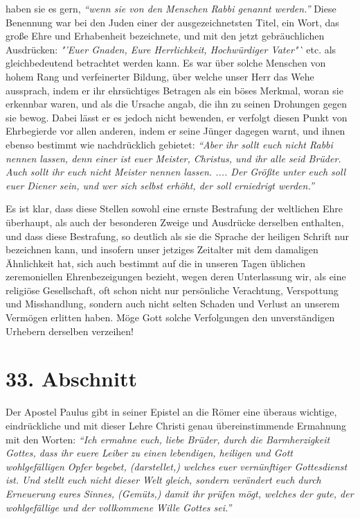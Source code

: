 haben sie es gern,
\textit{"`wenn sie von den Menschen Rabbi genannt
werden."'}
Diese Benennung war bei den Juden einer der
ausgezeichnetsten Titel, ein Wort, das große Ehre und Erhabenheit bezeichnete,
und mit den jetzt gebräuchlichen Ausdrücken: \textit{"'Euer Gnaden, Eure
Herrlichkeit, Hochwürdiger Vater"`} etc. als gleichbedeutend betrachtet werden
kann. Es war
über solche Menschen von hohem Rang und verfeinerter Bildung, über welche unser
Herr das Wehe aussprach, indem er ihr ehrsüchtiges Betragen als ein böses
Merkmal, woran sie erkennbar waren, und als die Ursache angab, die ihn zu seinen
Drohungen gegen sie bewog. Dabei lässt er es jedoch nicht bewenden, er verfolgt
diesen Punkt von Ehrbegierde vor allen anderen, indem er seine Jünger dagegen
warnt, und ihnen ebenso bestimmt wie nachdrücklich gebietet:
\textit{"`Aber ihr sollt
euch nicht Rabbi nennen lassen, denn einer ist euer Meister, Christus, und ihr
alle seid Brüder. Auch sollt ihr euch nicht Meister nennen lassen. .... Der
Größte unter euch soll euer Diener sein, und wer sich selbst erhöht, der soll
erniedrigt werden."'}

\medskip

Es ist klar, dass diese Stellen sowohl eine ernste Bestrafung der weltlichen
Ehre
überhaupt, als auch der besonderen Zweige und Ausdrücke derselben enthalten, und
dass diese Bestrafung, so deutlich als sie die Sprache der heiligen Schrift nur
bezeichnen kann, und insofern unser jetziges Zeitalter mit dem damaligen
Ähnlichkeit hat, sich auch bestimmt auf die in unseren Tagen üblichen
zeremoniellen Ehrenbezeigungen bezieht, wegen deren Unterlassung wir, als eine
religiöse Gesellschaft, oft schon nicht nur persönliche Verachtung, Verspottung
und Misshandlung, sondern auch nicht selten Schaden und Verlust an unserem
Vermögen erlitten haben. Möge Gott solche Verfolgungen den unverständigen
Urhebern derselben verzeihen!

\section{33. Abschnitt} \label{kap9_ab33}

Der Apostel Paulus gibt in seiner Epistel an die Römer eine überaus wichtige,
eindrückliche und mit dieser Lehre Christi genau übereinstimmende Ermahnung mit
den Worten:
\textit{"`Ich ermahne euch, liebe Brüder, durch die Barmherzigkeit Gottes,
dass ihr euere Leiber zu einen lebendigen, heiligen und Gott wohlgefälligen
Opfer
begebet, (darstellet,) welches euer vernünftiger Gottesdienst ist. Und stellt
euch nicht dieser Welt gleich, sondern verändert euch durch Erneuerung eures
Sinnes, (Gemüts,) damit ihr prüfen mögt, welches der gute, der wohlgefällige
und der vollkommene Wille Gottes sei."'}

